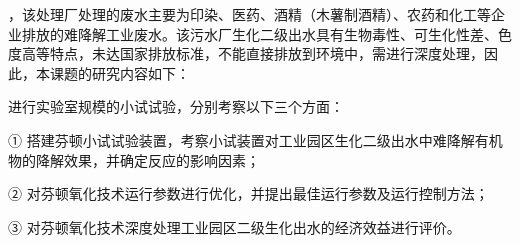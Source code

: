 ，该处理厂处理的废水主要为印染、医药、酒精（木薯制酒精）、农药和化工等企业排放的难降解工业废水。该污水厂生化二级出水具有生物毒性、可生化性差、色度高等特点，未达国家排放标准，不能直接排放到环境中，需进行深度处理，因此，本课题的研究内容如下：\par
进行实验室规模的小试试验，分别考察以下三个方面：\par
① 搭建芬顿小试试验装置，考察小试装置对工业园区生化二级出水中难降解有机物的降解效果，并确定反应的影响因素；\par
② 对芬顿氧化技术运行参数进行优化，并提出最佳运行参数及运行控制方法；\par
③ 对芬顿氧化技术深度处理工业园区二级生化出水的经济效益进行评价。\par
